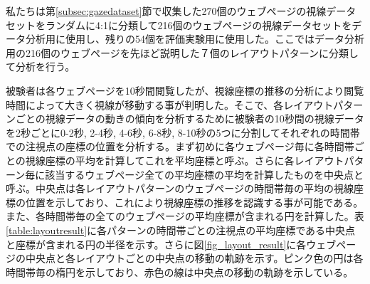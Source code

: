 \par 私たちは第\ref{subsec:gazedataset}節で収集した270個のウェブページの視線データセットをランダムに4:1に分類して216個のウェブページの視線データセットをデータ分析用に使用し、残りの54個を評価実験用に使用した。ここではデータ分析用の216個のウェブページを先ほど説明した７個のレイアウトパターンに分類して分析を行う。

\par 被験者は各ウェブページを10秒間閲覧したが、視線座標の推移の分析により閲覧時間によって大きく視線が移動する事が判明した。そこで、各レイアウトパターンごとの視線データの動きの傾向を分析するために被験者の10秒間の視線データを2秒ごとに0-2秒, 2-4秒, 4-6秒, 6-8秒, 8-10秒の5つに分割してそれぞれの時間帯での注視点の座標の位置を分析する。まず初めに各ウェブページ毎に各時間帯ごとの視線座標の平均を計算してこれを平均座標と呼ぶ。さらに各レイアウトパターン毎に該当するウェブページ全ての平均座標の平均を計算したものを中央点と呼ぶ。中央点は各レイアウトパターンのウェブページの時間帯毎の平均の視線座標の位置を示しており、これにより視線座標の推移を認識する事が可能である。また、各時間帯毎の全てのウェブページの平均座標が含まれる円を計算した。表\ref{table:layoutresult}に各パターンの時間帯ごとの注視点の平均座標である中央点と座標が含まれる円の半径を示す。さらに図\ref{fig_layout_result}に各ウェブページの中央点と各レイアウトごとの中央点の移動の軌跡を示す。ピンク色の円は各時間帯毎の楕円を示しており、赤色の線は中央点の移動の軌跡を示している。

